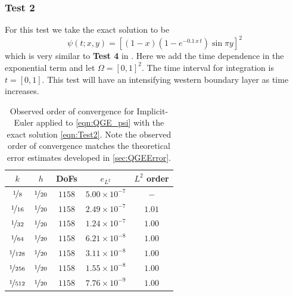 \subsubsection*{Test 2}
For this test we take the exact solution to be
\begin{equation}
  \psi(t;x,y) = \left[(1-x)\left(1-e^{-0.1\,x\,t}\right) \sin \pi y\right]^2
  \label{eqn:Test2}
\end{equation}
which is very similar to \textbf{Test 4} in \cite{Foster}. Here we add the time
dependence in the exponential term and let $\Omega = [0,1]^2$. The time interval
for integration is $t = [0,1]$. This test will have an intensifying western
boundary layer as time increases.
\begin{table}
\begin{center}
  \begin{tabular}{|c|c|c|c|c|}
    \hline
    $k$ & $h$ & DoFs & $e_{L^2}$ & $L^2$ order \\%
    \hline
$\nicefrac{1}{8}$ & $\nicefrac{1}{20}$ & $1158$ & $5.00\times 10^{-7}$ & $-$ \\%
$\nicefrac{1}{16}$ & $\nicefrac{1}{20}$ & $1158$ & $2.49\times 10^{-7}$ & $1.01$ \\%
$\nicefrac{1}{32}$ & $\nicefrac{1}{20}$ & $1158$ & $1.24\times 10^{-7}$ & $1.00$ \\%
$\nicefrac{1}{64}$ & $\nicefrac{1}{20}$ & $1158$ & $6.21\times 10^{-8}$ & $1.00$ \\%
$\nicefrac{1}{128}$ & $\nicefrac{1}{20}$ & $1158$ & $3.11\times 10^{-8}$ & $1.00$ \\%
$\nicefrac{1}{256}$ & $\nicefrac{1}{20}$ & $1158$ & $1.55\times 10^{-8}$ & $1.00$ \\%
$\nicefrac{1}{512}$ & $\nicefrac{1}{20}$ & $1158$ & $7.76\times 10^{-9}$ & $1.00$ \\%
    \hline
  \end{tabular}
\end{center}
  \caption{Observed order of convergence for Implicit-Euler applied to
    \eqref{eqn:QGE_psi} with the exact solution \eqref{eqn:Test2}. Note the observed
    order of convergence matches the theoretical error estimates developed in
    \autoref{sec:QGEError}.}
  \label{tab:Test2Time}
\end{table}

